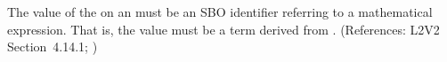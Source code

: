 The value of the   on an \Event must be an SBO
identifier referring to a mathematical expression.  That is, the value must
be a term derived from \sboevent.  (References: L2V2 Section~4.14.1; )
